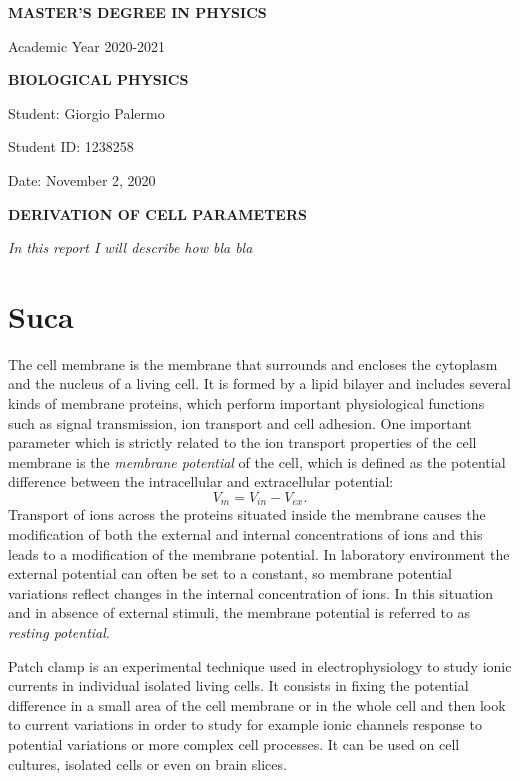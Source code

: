 \documentclass[a4paper]{article}
\newcommand{\thedate}{November 2, 2020}
\begin{document}
\hypersetup{linkcolor = black}
\hypersetup{linkcolor = blue}
\thispagestyle{plain}
\begin{center}
    \textbf{MASTER'S DEGREE IN PHYSICS}
    
    Academic Year 2020-2021
    
    \medskip
    \textbf{BIOLOGICAL PHYSICS}
\end{center}

\vspace{0.0cm}
Student: Giorgio Palermo

Student ID: 1238258

Date: \thedate
\begin{center}
\textbf{DERIVATION OF CELL PARAMETERS}
\medskip
\end{center}
\noindent
\textit{In this report I will describe how bla bla }
\section{Suca}
The cell membrane is the membrane that surrounds and encloses the cytoplasm and the nucleus of a living cell.
It is formed by a lipid bilayer and includes several kinds of membrane proteins, which perform important physiological functions such as signal transmission, ion transport and cell adhesion.
One important parameter which is strictly related to the ion transport properties of the cell membrane is the \emph{membrane potential} of the cell, which is defined as the potential difference between the intracellular and extracellular potential: \[V_m = V_{in}-V_{ex}.\]
Transport of ions across the proteins situated inside the membrane causes the modification of both the external and internal concentrations of ions and this leads to a modification of the membrane potential.
In laboratory environment the external potential can often be set to a constant, so membrane potential variations reflect changes in the internal concentration of ions.
In this situation and in absence of external stimuli, the membrane potential is referred to as \emph{resting potential}.

Patch clamp is an experimental technique used in electrophysiology to study ionic currents in individual isolated living cells.
It consists in fixing the potential difference in a small area of the cell membrane or in the whole cell and then look to current variations in order to study for example ionic channels response to potential variations or more complex cell processes.
It can be used on cell cultures, isolated cells or even on brain slices.
\end{document}
